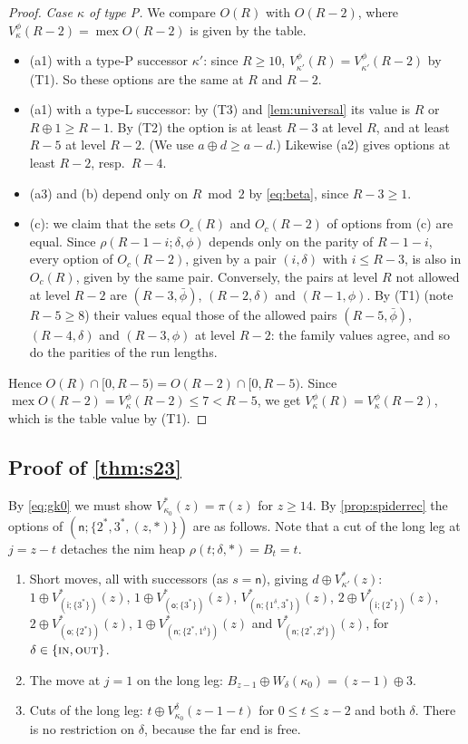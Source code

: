\documentclass[11pt]{amsart}
\theoremstyle{definition}
\theoremstyle{remark}
\newcommand{\mex}{\operatorname{mex}}
\newcommand{\sn}{\mathsf{n}}
\newcommand{\si}{\mathsf{i}}
\newcommand{\so}{\mathsf{o}}
\newcommand{\free}{\ast}
\newcommand{\IN}{\textup{\textsc{in}}}
\newcommand{\OUT}{\textup{\textsc{out}}}
\begin{document}
\begin{proof}
\emph{Case $\kappa$ of type P.} We compare $O(R)$ with $O(R-2)$, where $V^\phi_\kappa(R-2)=\mex O(R-2)$ is given by the table.
\begin{itemize}[leftmargin=*]
\item (a1) with a type-P successor $\kappa'$: since $R\ge10$, $V^\phi_{\kappa'}(R)=V^\phi_{\kappa'}(R-2)$ by (T1). So these options are the same at $R$ and $R-2$.
\item (a1) with a type-L successor: by (T3) and \cref{lem:universal} its value is $R$ or $R\oplus1\ge R-1$. By (T2) the option is at least $R-3$ at level $R$, and at least $R-5$ at level $R-2$. (We use $a\oplus d\ge a-d$.) Likewise (a2) gives options at least $R-2$, resp.\ $R-4$.
\item (a3) and (b) depend only on $R\bmod2$ by \eqref{eq:beta}, since $R-3\ge1$.
\item (c): we claim that the sets $O_c(R)$ and $O_c(R-2)$ of options from (c) are equal. Since $\rho(R-1-i;\delta,\phi)$ depends only on the parity of $R-1-i$, every option of $O_c(R-2)$, given by a pair $(i,\delta)$ with $i\le R-3$, is also in $O_c(R)$, given by the same pair. Conversely, the pairs at level $R$ not allowed at level $R-2$ are $(R-3,\bar\phi)$, $(R-2,\delta)$ and $(R-1,\phi)$. By (T1) (note $R-5\ge8$) their values equal those of the allowed pairs $(R-5,\bar\phi)$, $(R-4,\delta)$ and $(R-3,\phi)$ at level $R-2$: the family values agree, and so do the parities of the run lengths.
\end{itemize}
Hence $O(R)\cap[0,R-5)=O(R-2)\cap[0,R-5)$. Since $\mex O(R-2)=V^\phi_\kappa(R-2)\le7<R-5$, we get $V^\phi_\kappa(R)=V^\phi_\kappa(R-2)$, which is the table value by (T1).
\end{proof}

\subsection{Proof of \texorpdfstring{\cref{thm:s23}}{the theorem for S(2,3,z)}}
By \eqref{eq:gk0} we must show $V^\free_{\kappa_0}(z)=\pi(z)$ for $z\ge14$. By \cref{prop:spiderrec} the options of $(\sn;\{2^\free,3^\free,(z,\free)\})$ are as follows. Note that a cut of the long leg at $j=z-t$ detaches the nim heap $\rho(t;\delta,\free)=B_t=t$.
\begin{enumerate}[label=\textup{(\roman*)},leftmargin=*]
\item Short moves, all with successors (as $s=\sn$), giving $d\oplus V^\free_{\kappa'}(z)$:
 $1\oplus V^\free_{(\si;\{3^\free\})}(z)$, $1\oplus V^\free_{(\so;\{3^\free\})}(z)$,
 $V^\free_{(\sn;\{1^\delta,3^\free\})}(z)$,
 $2\oplus V^\free_{(\si;\{2^\free\})}(z)$, $2\oplus V^\free_{(\so;\{2^\free\})}(z)$,
 $1\oplus V^\free_{(\sn;\{2^\free,1^\delta\})}(z)$ and
 $V^\free_{(\sn;\{2^\free,2^\delta\})}(z)$, for $\delta\in\{\IN,\OUT\}$.
\item The move at $j=1$ on the long leg: $B_{z-1}\oplus W_\delta(\kappa_0)=(z-1)\oplus3$.
\item Cuts of the long leg: $t\oplus V^\delta_{\kappa_0}(z-1-t)$ for $0\le t\le z-2$ and both $\delta$. There is no restriction on $\delta$, because the far end is free.
\end{enumerate}
\end{document}
